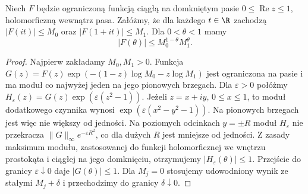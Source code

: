 \begin{lemat}
\label{lem:dt-three-lines}
Niech $F$ będzie ograniczoną funkcją ciągłą na domkniętym
pasie $0\le\operatorname{Re}z\le1$, holomorficzną wewnątrz
pasa. Załóżmy, że dla każdego $t\in\R$ zachodzą
$|F(it)|\le M_0$ oraz $|F(1+it)|\le M_1$.
Dla $0<\theta<1$ mamy
\[
 |F(\theta)|\le M_0^{1-\theta}M_1^\theta.
\]
\end{lemat}
\begin{proof}
Najpierw zakładamy $M_0,M_1>0$. Funkcja
$G(z)=F(z)\exp(-(1-z)\log M_0-z\log M_1)$
jest ograniczona na pasie i ma moduł co najwyżej jeden
na jego pionowych brzegach. Dla $\varepsilon>0$ połóżmy
$H_\varepsilon(z)=G(z)\exp(\varepsilon(z^2-1))$.
Jeżeli $z=x+iy$, $0\le x\le1$, to moduł dodatkowego
czynnika wynosi $\exp(\varepsilon(x^2-y^2-1))$.
Na pionowych brzegach jest więc nie większy od jedności.
Na poziomych odcinkach $y=\pm R$ moduł $H_\varepsilon$
nie przekracza $\|G\|_\infty e^{-\varepsilon R^2}$,
co dla dużych $R$ jest mniejsze od jedności.
Z zasady maksimum modułu, zastosowanej do funkcji
holomorficznej we wnętrzu prostokąta i ciągłej na jego
domknięciu, otrzymujemy
$|H_\varepsilon(\theta)|\le1$.
Przejście do granicy $\varepsilon\downarrow0$ daje
$|G(\theta)|\le1$. Dla $M_j=0$ stosujemy udowodniony
wynik ze stałymi $M_j+\delta$ i przechodzimy do
granicy $\delta\downarrow0$.
\end{proof}

